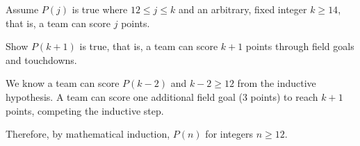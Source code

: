 \begin{questions}
\begin{solution}
    Assume $P(j)$ is true where $12 \leq j \leq k$ and an arbitrary, fixed integer $k \geq 14$, that is, a team can score $j$ points. 

    Show $P(k+1)$ is true, that is, a team can score $k+1$ points through field goals and touchdowns.

    We know a team can score $P(k-2)$ and $k -2 \geq 12$ from the inductive hypothesis. A team can score one additional field goal (3 points) to reach $k+1$ points, competing the inductive step. 

    Therefore, by mathematical induction, $P(n)$ for integers $n \geq 12$. 
\end{solution}




  





\end{questions}
